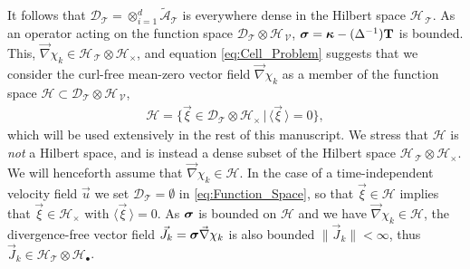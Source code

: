 \documentclass[11pt]{amsart}
\newcommand{\Tb}{\mathbf{T}}
\newcommand{\Tc}{\mathcal{T}}
\newcommand{\Vc}{\mathcal{V}}
\newcommand{\Hs}{\mathscr{H}}
\newcommand{\As}{\mathscr{A}}
\newcommand{\Ds}{\mathscr{D}}
\newcommand\bsig{\mbox{\boldmath${\sigma}$}}
\newcommand\bkappa{\mbox{\boldmath${\kappa}$}}
\begin{document}
It follows that $\Ds_{\Tc}=\otimes_{i=1}^d\tilde{\As}_{\Tc}$ is everywhere
dense in the Hilbert space $\Hs_{\,\Tc}$. As an operator acting on the
function  space $\Ds_{\Tc}\otimes\Hs_{\,\Vc}$, $\bsig=\bkappa-(\Delta^{-1})\Tb$ is
bounded. This, $\vec{\nabla}\chi_k\in\Hs_{\,\Tc}\otimes\Hs_\times$, and equation
\eqref{eq:Cell_Problem} suggests that we consider the curl-free
mean-zero vector field $\vec{\nabla}\chi_k$ as a member of the function space 
$\Hs\subset\Ds_{\Tc}\otimes\Hs_{\,\Vc}$,   
%
\begin{align}\label{eq:Function_Space}
  \Hs=\{\vec{\xi}\in\Ds_{\Tc}\otimes\Hs_\times \,|\, \langle\vec{\xi}\,\rangle=0\},  
\end{align}
%
which will be used extensively in the rest of this manuscript. We
stress that $\Hs$ is \emph{not} a Hilbert space, and is instead a
dense subset of the Hilbert space $\Hs_{\,\Tc}\otimes\Hs_\times$. We will
henceforth assume that $\vec{\nabla}\chi_k\in\Hs$. In the case of a
time-independent velocity field $\vec{u}$ we set $\Ds_{\Tc}=\emptyset$ in 
\eqref{eq:Function_Space}, so that $\vec{\xi}\in\Hs$ implies that
$\vec{\xi}\in\Hs_\times$ with $\langle\vec{\xi}\,\rangle=0$. As $\bsig$ is bounded on $\Hs$
and we have $\vec{\nabla}\chi_k\in\Hs$, the divergence-free vector field
$\vec{J}_k=\bsig\vec{\nabla}\chi_k$ is also bounded $\|\vec{J}_k\|<\infty$, thus
$\vec{J}_k\in\Hs_{\Tc}\otimes\Hs_\bullet$.   
\end{document}
